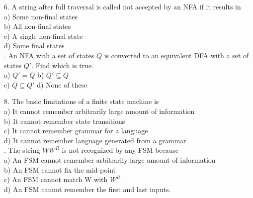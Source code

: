 \documentclass[a4,9pt]{beamer}
\begin{document}
\begin{frame}
6. A string after full traversal is called not accepted by an NFA if it results in\\
\hspace*{0.5cm} a) Some non-final states\\
\hspace*{0.5cm} b) All non-final states\\
\hspace*{0.5cm} c) A single non-final state \\
\hspace*{0.5cm} d) Some final states \\

\vspace*{0.2cm}
. An NFA with a set of states $Q$ is converted to an equivalent DFA with a set of states $Q'$. Find which is true.\\
\hspace*{0.5cm} a) $Q' = Q$             \hspace*{0.7cm}     b) $Q' \subseteq Q$ \\
\hspace*{0.5cm} c) $Q \subseteq Q'$        \hspace*{0.7cm}  d) None of these \\

\vspace*{0.2cm}
\end{frame}

\begin{frame}
8. The basic limitations of a finite state machine is \\
\hspace*{0.5cm} a) It cannot remember arbitrarily large amount of information \\
\hspace*{0.5cm} b) It cannot remember state transitions \\
\hspace*{0.5cm} c) It cannot remember grammar for a language \\
\hspace*{0.5cm} d) It cannot remember language generated from a grammar \\

\vspace*{0.2cm}
. The string $WW^R$ is not recognized by any FSM because \\
\hspace*{0.5cm} a) An FSM cannot remember arbitrarily large amount of information\\
\hspace*{0.5cm} b) An FSM cannot fix the mid-point \\
\hspace*{0.5cm} c) An FSM cannot match W with $W^R$ \\
\hspace*{0.5cm} d) An FSM cannot remember the first and last inputs.\\

\vspace*{0.2cm}
\end{frame}
\end{document}
